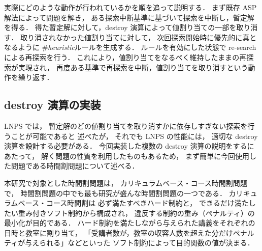 実際にどのような動作が行われているかを順を追って説明する．
まず既存 ASP 解法によって問題を解き，
ある探索中断基準に基づいて探索を中断し，暫定解を得る．
得た暫定解に対して，destroy 演算によって値割り当ての一部を取り消す．
取り消されなかった値割り当てに対して，
次回探索開始時に優先的に真となるように
\#\textit{heuristic}ルールを生成する．
ルールを有効にした状態で re-search による再探索を行う．
これにより，値割り当てをなるべく維持したままの再探索が実現され，
再度ある基準で再探索を中断，値割り当てを取り消すという動作を繰り返す．

\subsection{destroy 演算の実装}
LNPS では，
暫定解のどの値割り当てを取り消すかに依存しすぎない探索を行うことが可能であると
述べたが，
それでも LNPS の性能には，
適切な destroy 演算を設計する必要がある．
今回実装した複数の destroy 演算の説明をするにあたって，
解く問題の性質を利用したものもあるため，
まず簡単に今回使用した問題である時間割問題について述べる．

本研究で対象とした時間割問題は，
カリキュラムベース・コース時間割問題で，
時間割問題の中でも最も研究が盛んな時間割問題の一つである．
カリキュラムベース・コース時間割は
必ず満たすべきハード制約と，
できるだけ満たしたい重み付きソフト制約から構成され，
違反する制約の重み（ペナルティ）の最小化が目的である．
ハード制約を満たしながら与えられた講義をそれぞれの日時と教室に割り当て，
「受講者数が，教室の収容人数を超えた分だけペナルティが与えられる」などといった
ソフト制約によって目的関数の値が決まる．\\

